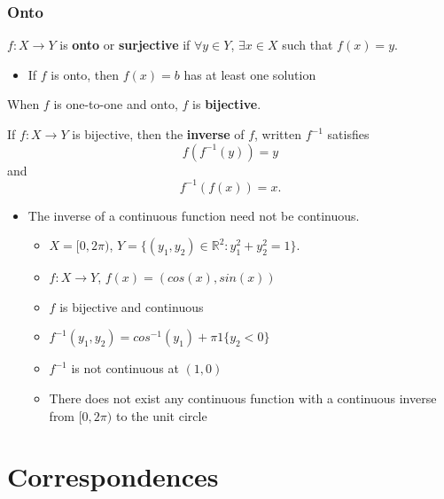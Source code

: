 \documentclass[compress]{beamer}
\def\R{\mathbb{R}}
\renewcommand{\to}{{\rightarrow}}
\begin{document}
\begin{frame}
  \frametitle{Onto}
  \begin{definition}
    $f:X \to Y$ is \textbf{onto} or \textbf{surjective} if $\forall y
    \in Y$, $\exists x \in X$ such that $f(x) = y$.
  \end{definition}
  \begin{itemize}
  \item If $f$ is onto, then $f(x) = b$ has at least one solution
  \end{itemize}
  \begin{definition} 
    When $f$ is one-to-one and onto, $f$ is \textbf{bijective}. 
  \end{definition}
  \begin{definition}
    If $f:X \to Y$ is bijective, then the \textbf{inverse} of $f$,
    written $f^{-1}$ satisfies
    \[ f(f^{-1} (y)) = y  \]
    and 
    \[ f^{-1} ( f(x) ) = x. \]
  \end{definition}
\end{frame}

\begin{frame}
  \begin{itemize}
  \item The inverse of a continuous function need not be continuous.
    \begin{example}
      \begin{itemize}
      \item $X = [0,2\pi)$, $Y = \{(y_1,y_2) \in \R^2 : y_1^2 + y_2^2
        = 1 \}$.  
      \item $f:X \to Y$, $f(x) = (cos(x), sin(x))$
      \item $f$ is bijective and continuous
      \item $f^{-1}(y_1,y_2) = cos^{-1}(y_1) + \pi 1\{y_2<0\}$
      \item $f^{-1}$ is not continuous at $(1,0)$ 
      \item There does not exist any continuous function with a
        continuous inverse from $[0,2\pi)$ to the unit circle
      \end{itemize}
    \end{example}
  \end{itemize}
\end{frame}

\section{Correspondences}
\end{document}
